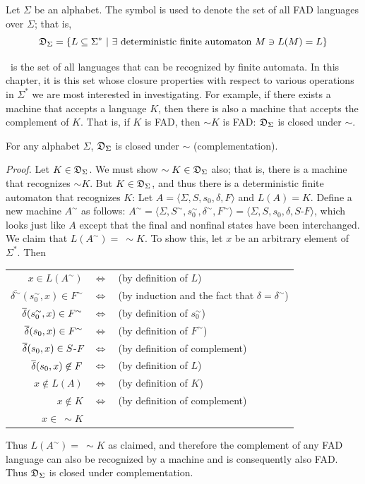 \begin{dfn}\label{dfn-5.3}
Let $\Sigma$ be an alphabet. The symbol \DSIG  is used to denote the
set of all FAD languages over $\Sigma$; that is,
\[ \DSIG =\{L \subseteq \Sigma^*\ |\ \exists
\text{ deterministic finite automaton } M \ni L(M) = L\} \]
\end{dfn}

\DSIG\ is the set of all languages that can be recognized by
finite automata. In this chapter, it is this set whose closure properties with
respect to various operations in $\Sigma^*$ we are most interested in
investigating. For example, if there exists a machine that accepts a language
$K$, then there is also a machine that accepts the complement of $K$. That is,
if $K$ is FAD, then $\sim   K$ is FAD: $\mathfrak{D}_\Sigma$ is closed under
$\sim$.

\begin{thm}\label{thm-5.1}
For any alphabet $\Sigma$, $\mathfrak{D}_\Sigma$ is closed under $\sim$
(complementation).

\emph{Proof.} Let $K \in \mathfrak{D}_\Sigma$. We must show $\sim   K \in
\mathfrak{D}_\Sigma$ also; that is, there is a machine that recognizes
$\sim   K$. But $K \in \mathfrak{D}_\Sigma$, and thus there is a deterministic
finite automaton that recognizes $K$: Let
$A =\langle\Sigma,S,s_0,\delta,F\rangle$ and $L(A) = K$. Define a new machine
$A^\sim$ as follows:
$A^\sim =\langle\Sigma,S^\sim,s_0^\sim,\delta^\sim,F^\sim\rangle =
\langle\Sigma,S,s_0,\delta,S$-$F\rangle$, which looks just like $A$ except that
the final and nonfinal states have been interchanged. We claim that
$L(A^\sim) =\ \sim   K$. To show this, let $x$ be an arbitrary element of
$\Sigma^*$. Then
\begin{center}
\begin{tabular}{rcl}
$x \in L(A^\sim)$ & $\Leftrightarrow$ & (by definition of $L$) \\
$\overline{\delta^\sim}(s_0^\sim,x) \in F^\sim$ & $\Leftrightarrow$ &
	(by induction and the fact that $\delta = \delta^\sim$) \\
$\overline{\delta}(s_0^\sim,x) \in F^\sim$ & $\Leftrightarrow$ &
	(by definition of $s_0^\sim$) \\
$\overline{\delta}(s_0,x) \in F^\sim$ & $\Leftrightarrow$ &
	(by definition of $F^\sim$) \\
$\overline{\delta}(s_0,x)\in S$-$F$ & $\Leftrightarrow$ &
	(by definition of complement) \\
$\overline{\delta}(s_0,x) \not \in F$ & $\Leftrightarrow$ &
	(by definition of $L$) \\
$x \not \in L(A)$ & $\Leftrightarrow$ &
	(by definition of $K$) \\
$x \not \in K$ & $\Leftrightarrow$ &
	(by definition of complement) \\
$x \in\ \sim   K$ &&
\end{tabular}
\end{center}
Thus $L(A^\sim) =\ \sim   K$ as claimed, and therefore the complement of any FAD
language can also be recognized by a machine and is consequently also FAD. Thus
$\mathfrak{D}_\Sigma$ is closed under complementation.
\end{thm}

